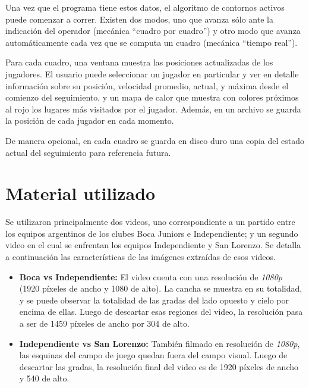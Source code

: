 Una vez que el programa tiene estos datos, el algoritmo de contornos activos puede comenzar a correr. Existen dos modos, uno que avanza sólo ante la indicación del operador (mecánica ``cuadro por cuadro'') y otro modo que avanza automáticamente cada vez que se computa un cuadro (mecánica ``tiempo real'').  %

Para cada cuadro, una ventana muestra las posiciones actualizadas de los jugadores. El usuario puede seleccionar un jugador en particular y ver en detalle información sobre su posición, velocidad promedio, actual, y máxima desde el comienzo del seguimiento, y un mapa de calor que muestra con colores próximos al rojo los lugares más visitados por el jugador. Además, en un archivo se guarda la posición de cada jugador en cada momento.

De manera opcional, en cada cuadro se guarda en disco duro una copia del estado actual del seguimiento para referencia futura.

\section{Material utilizado}

Se utilizaron principalmente dos videos, uno correspondiente a un partido entre los equipos argentinos de los clubes Boca Juniors e Independiente; y un segundo video en el cual se enfrentan los equipos Independiente y San Lorenzo. Se detalla a continuación las características de las imágenes extraídas de esos videos.

\begin{itemize}
  \item \textbf{Boca vs Independiente:} El video cuenta con una resolución de \textit{1080p} (1920 píxeles de ancho y 1080 de alto). La cancha se muestra en su totalidad, y se puede observar la totalidad de las gradas del lado opuesto y cielo por encima de ellas. Luego de descartar esas regiones del video, la resolución pasa a ser de 1459 píxeles de ancho por 304 de alto. %
  \item \textbf{Independiente vs San Lorenzo:} También filmado en resolución de \textit{1080p}, las esquinas del campo de juego quedan fuera del campo visual. Luego de descartar las gradas, la resolución final del video es de 1920 píxeles de ancho y 540 de alto. %
\end{itemize}

